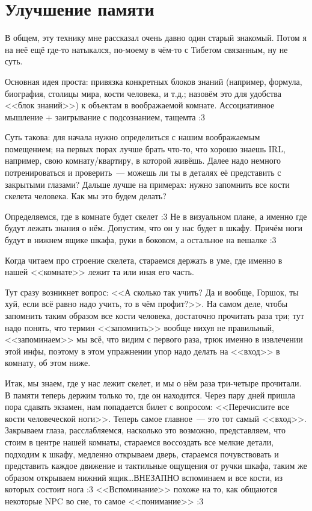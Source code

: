 \documentclass[a5paper,12pt,twoside]{memoir}
\begin{document}
\chapter{Улучшение памяти}
В общем, эту технику мне рассказал очень давно один старый знакомый. Потом я на неё ещё где-то натыкался, по-моему в чём-то с Тибетом связанным, ну не суть.
 
Основная идея проста: привязка конкретных блоков знаний (например, формула, биография, столицы мира, кости человека, и т.д.; назовём это для удобства <<блок знаний>>) к объектам в воображаемой комнате. Ассоциативное мышление + заигрывание с подсознанием, тащемта :3
 
Суть такова: для начала нужно определиться с нашим воображаемым помещением; на первых порах лучше брать что-то, что хорошо знаешь IRL, например, свою ком\-на\-ту/ква\-рти\-ру, в которой живёшь. Далее надо немного потренироваться и проверить~--- можешь ли ты в деталях её представить с закрытыми глазами? Дальше лучше на примерах: нужно запомнить все кости скелета человека. Как мы это будем делать?

Определяемся, где в комнате будет скелет :3 Не в визуальном плане, а именно где будут лежать знания о нём. Допустим, что он у нас будет в шкафу. Причём ноги будут в нижнем ящике шкафа, руки в боковом, а остальное на вешалке :3 

Когда читаем про строение скелета, стараемся держать в уме, где именно в нашей <<комнате>> лежит та или иная его часть.
 
Тут сразу возникнет вопрос: <<А сколько так учить? Да и вообще, Горшок, ты хуй, если всё равно надо учить, то в чём профит?>>. На самом деле, чтобы запомнить таким образом все кости человека, достаточно прочитать раза три; тут надо понять, что термин <<запомнить>> вообще нихуя не правильный, <<запоминаем>> мы всё, что видим с первого раза, трюк именно в извлечении этой инфы, поэтому в этом упражнении упор надо делать на <<вход>> в комнату, об этом ниже. 

Итак, мы знаем, где у нас лежит скелет, и мы о нём раза три-четыре прочитали. В памяти теперь держим только то, где он находится. Через пару дней пришла пора сдавать экзамен, нам попадается билет с вопросом: <<Перечислите все кости человеческой ноги>>. Теперь самое главное~--- это тот самый <<вход>>. Закрываем глаза, расслабляемся, насколько это возможно, представляем, что стоим в центре нашей комнаты, стараемся воссоздать все мелкие детали, подходим к шкафу, медленно открываем дверь, стараемся почувствовать и представить каждое движение и тактильные ощущения от ручки шкафа, таким же образом открываем нижний ящик\ldots ВНЕЗАПНО вспоминаем и все кости, из которых состоит нога :3 <<Вспоминание>> похоже на то, как общаются некоторые NPC во сне, то самое <<понимание>> :3
 
\end{document}
